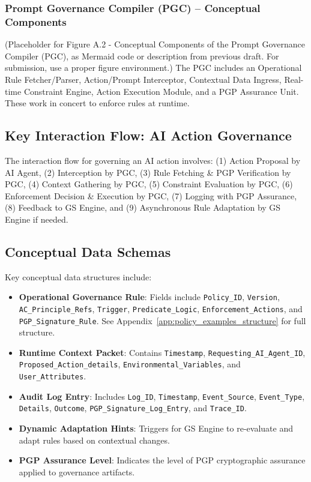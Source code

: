 \documentclass[sigconf,review,anonymous=false]{acmart} %
\begin{document}
\subsubsection{Prompt Governance Compiler (PGC) – Conceptual Components}
\label{app:architecture_details_pgc_components}
(Placeholder for Figure A.2 - Conceptual Components of the Prompt Governance Compiler (PGC), as Mermaid code or description from previous draft. For submission, use a proper figure environment.)
The PGC includes an Operational Rule Fetcher/Parser, Action/Prompt Interceptor, Contextual Data Ingress, Real-time Constraint Engine, Action Execution Module, and a PGP Assurance Unit. These work in concert to enforce rules at runtime.

\subsection{Key Interaction Flow: AI Action Governance}
\label{app:architecture_details_interaction_flow}
The interaction flow for governing an AI action involves: (1) Action Proposal by AI Agent, (2) Interception by PGC, (3) Rule Fetching \& PGP Verification by PGC, (4) Context Gathering by PGC, (5) Constraint Evaluation by PGC, (6) Enforcement Decision \& Execution by PGC, (7) Logging with PGP Assurance, (8) Feedback to GS Engine, and (9) Asynchronous Rule Adaptation by GS Engine if needed.

\subsection{Conceptual Data Schemas}
\label{app:architecture_details_data_schemas}
Key conceptual data structures include:
\begin{itemize}
    \item \textbf{Operational Governance Rule}: Fields include \texttt{Policy\_ID}, \texttt{Version}, \texttt{AC\_Principle\_Refs}, \texttt{Trigger}, \texttt{Predicate\_Logic}, \texttt{Enforcement\_Actions}, and \texttt{PGP\_Signature\_Rule}. See Appendix~\ref{app:policy_examples_structure} for full structure.
    \item \textbf{Runtime Context Packet}: Contains \texttt{Timestamp}, \texttt{Requesting\_AI\_Agent\_ID}, \texttt{Proposed\_Action\_details}, \texttt{Environmental\_Variables}, and \texttt{User\_Attributes}.
    \item \textbf{Audit Log Entry}: Includes \texttt{Log\_ID}, \texttt{Timestamp}, \texttt{Event\_Source}, \texttt{Event\_Type}, \texttt{Details}, \texttt{Outcome}, \texttt{PGP\_Signature\_Log\_Entry}, and \texttt{Trace\_ID}.
    \item \textbf{Dynamic Adaptation Hints}: Triggers for GS Engine to re-evaluate and adapt rules based on contextual changes.
    \item \textbf{PGP Assurance Level}: Indicates the level of PGP cryptographic assurance applied to governance artifacts.
\end{itemize}
\end{document}
